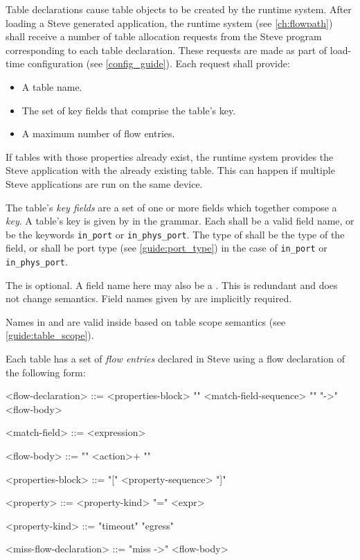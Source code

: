 Table declarations cause table objects to be created by the runtime system. After loading a Steve generated application, the runtime system (see \ref{ch:flowpath}) shall receive a number of table allocation requests from the Steve program corresponding to each table declaration. These requests are made as part of load-time configuration (see \ref{config_guide}). Each request shall provide:

\begin{itemize}
\item A table name.
\item The set of key fields that comprise the table's key.
\item A maximum number of flow entries.
\end{itemize}

If tables with those properties already exist, the runtime system provides the Steve application with the already existing table. This can happen if multiple Steve applications are run on the same device.

The table's \textit{key fields} are a set of one or more fields which together compose a \textit{key}. A table's key is given by  in the grammar. Each  shall be a valid field name, or be the keywords \texttt{in\_port} or \texttt{in\_phys\_port}. The type of  shall be the type of the field, or shall be port type (see \ref{guide:port_type}) in the case of \texttt{in\_port} or \texttt{in\_phys\_port}.

The  is optional. A field name here may also be a . This is redundant and does not change semantics. Field names given by  are implicitly required.

Names in  and  are valid inside  based on table scope semantics (see \ref{guide:table_scope}).

Each table has a set of \textit{flow entries} declared in Steve using a flow declaration of the following form:

\begin{minip}
\begin{grammar}
<flow-declaration> ::=
<properties-block>
"{" <match-field-sequence> "}" "->" <flow-body>

<match-field> ::= <expression>

<flow-body> ::= "{" <action>+ "}"

<properties-block> ::=
"[" <property-sequence> "]"

<property> ::=
<property-kind> "=" <expr>

<property-kind> ::=
"timeout"
\alt "egress"

<miss-flow-declaration> ::=
"miss ->" <flow-body>
\end{grammar}
\end{minip}

